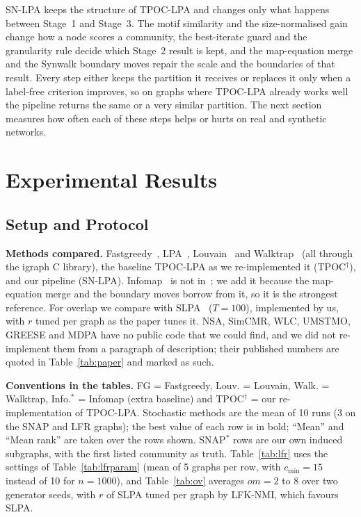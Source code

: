 \documentclass[conference]{IEEEtran}
\begin{document}
SN-LPA keeps the structure of TPOC-LPA and changes only what happens between Stage~1 and Stage~3. The motif similarity and the size-normalised gain change how a node scores a community, the best-iterate guard and the granularity rule decide which Stage~2 result is kept, and the map-equation merge and the Synwalk boundary moves repair the scale and the boundaries of that result. Every step either keeps the partition it receives or replaces it only when a label-free criterion improves, so on graphs where TPOC-LPA already works well the pipeline returns the same or a very similar partition. The next section measures how often each of these steps helps or hurts on real and synthetic networks.



\section{Experimental Results}\label{sec:results}
\subsection{Setup and Protocol}\label{sec:setup}
\textbf{Methods compared.} Fastgreedy~\cite{clauset2004}, LPA~\cite{raghavan2007}, Louvain~\cite{blondel2008} and Walktrap~\cite{pons2006} (all through the igraph C library), the baseline TPOC-LPA as we re-implemented it (TPOC$^{\dagger}$), and our pipeline (SN-LPA). Infomap~\cite{rosvall2008} is not in~\cite{kong2026}; we add it because the map-equation merge and the boundary moves borrow from it, so it is the strongest reference. For overlap we compare with SLPA~\cite{xie2011} ($T{=}100$), implemented by us, with $r$ tuned per graph as the paper tunes it. NSA, SimCMR, WLC, UMSTMO, GREESE and MDPA have no public code that we could find, and we did not re-implement them from a paragraph of description; their published numbers are quoted in Table~\ref{tab:paper} and marked as such.

\textbf{Conventions in the tables.} FG = Fastgreedy, Louv. = Louvain, Walk. = Walktrap, Info.$^{*}$ = Infomap (extra baseline) and TPOC$^{\dagger}$ = our re-implementation of TPOC-LPA. Stochastic methods are the mean of 10 runs (3 on the SNAP and LFR graphs); the best value of each row is in bold; ``Mean'' and ``Mean rank'' are taken over the rows shown. SNAP$^{*}$ rows are our own induced subgraphs, with the first listed community as truth. Table~\ref{tab:lfr} uses the settings of Table~\ref{tab:lfrparam} (mean of 5 graphs per row, with $c_{\min}{=}15$ instead of 10 for $n{=}1000$), and Table~\ref{tab:ov} averages $om=2$ to 8 over two generator seeds, with $r$ of SLPA tuned per graph by LFK-NMI, which favours SLPA.
\end{document}
